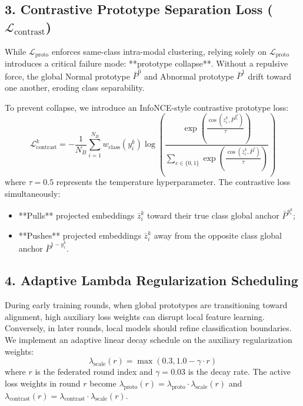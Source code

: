 \documentclass[12pt,a4paper]{amritareport}
\begin{document}
\subsection{3. Contrastive Prototype Separation Loss ($\mathcal{L}_{\text{contrast}}$)}
While $\mathcal{L}_{\text{proto}}$ enforces same-class intra-modal clustering, relying solely on $\mathcal{L}_{\text{proto}}$ introduces a critical failure mode: **prototype collapse**. Without a repulsive force, the global Normal prototype $\bar{P}^0$ and Abnormal prototype $\bar{P}^1$ drift toward one another, eroding class separability.

To prevent collapse, we introduce an InfoNCE-style contrastive prototype loss:
\begin{equation}
	\mathcal{L}_{\text{contrast}}^k = - \frac{1}{N_B} \sum_{i=1}^{N_B} w_{\text{class}}(y_i^k) \log \left(\frac{\exp\left(\frac{\cos(\bar{z}_i^k, \bar{P}^{y_i^k})}{\tau}\right)}{\sum_{c \in \{0, 1\}} \exp\left(\frac{\cos(\bar{z}_i^k, \bar{P}^c)}{\tau}\right)}\right)
\end{equation}
where $\tau = 0.5$ represents the temperature hyperparameter. The contrastive loss simultaneously:
\begin{itemize}
	\item **Pulls** projected embeddings $\bar{z}_i^k$ toward their true class global anchor $\bar{P}^{y_i^k}$;
	\item **Pushes** projected embeddings $\bar{z}_i^k$ away from the opposite class global anchor $\bar{P}^{1 - y_i^k}$.
\end{itemize}

\subsection{4. Adaptive Lambda Regularization Scheduling}
During early training rounds, when global prototypes are transitioning toward alignment, high auxiliary loss weights can disrupt local feature learning. Conversely, in later rounds, local models should refine classification boundaries. We implement an adaptive linear decay schedule on the auxiliary regularization weights:
\begin{equation}
	\lambda_{\text{scale}}(r) = \max\left(0.3, 1.0 - \gamma \cdot r\right)
\end{equation}
where $r$ is the federated round index and $\gamma = 0.03$ is the decay rate. The active loss weights in round $r$ become $\lambda_{\text{proto}}(r) = \lambda_{\text{proto}} \cdot \lambda_{\text{scale}}(r)$ and $\lambda_{\text{contrast}}(r) = \lambda_{\text{contrast}} \cdot \lambda_{\text{scale}}(r)$.
\end{document}

